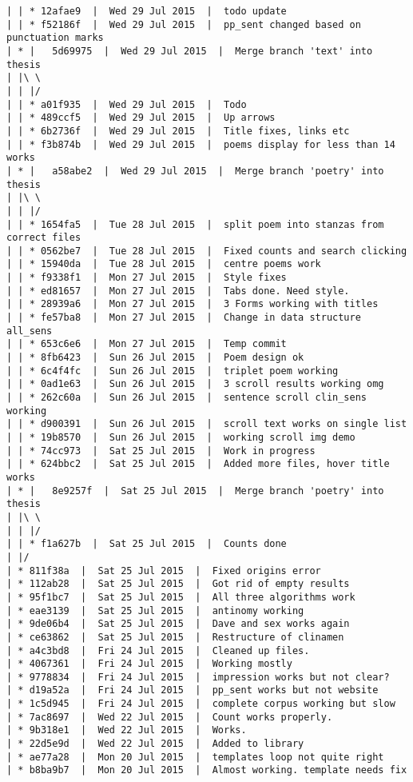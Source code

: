 \begin{verbatim}
| | * 12afae9  |  Wed 29 Jul 2015  |  todo update
| | * f52186f  |  Wed 29 Jul 2015  |  pp_sent changed based on punctuation marks
| * |   5d69975  |  Wed 29 Jul 2015  |  Merge branch 'text' into thesis
| |\ \  
| | |/  
| | * a01f935  |  Wed 29 Jul 2015  |  Todo
| | * 489ccf5  |  Wed 29 Jul 2015  |  Up arrows
| | * 6b2736f  |  Wed 29 Jul 2015  |  Title fixes, links etc
| | * f3b874b  |  Wed 29 Jul 2015  |  poems display for less than 14 works
| * |   a58abe2  |  Wed 29 Jul 2015  |  Merge branch 'poetry' into thesis
| |\ \  
| | |/  
| | * 1654fa5  |  Tue 28 Jul 2015  |  split poem into stanzas from correct files
| | * 0562be7  |  Tue 28 Jul 2015  |  Fixed counts and search clicking
| | * 15940da  |  Tue 28 Jul 2015  |  centre poems work
| | * f9338f1  |  Mon 27 Jul 2015  |  Style fixes
| | * ed81657  |  Mon 27 Jul 2015  |  Tabs done. Need style.
| | * 28939a6  |  Mon 27 Jul 2015  |  3 Forms working with titles
| | * fe57ba8  |  Mon 27 Jul 2015  |  Change in data structure all_sens
| | * 653c6e6  |  Mon 27 Jul 2015  |  Temp commit
| | * 8fb6423  |  Sun 26 Jul 2015  |  Poem design ok
| | * 6c4f4fc  |  Sun 26 Jul 2015  |  triplet poem working
| | * 0ad1e63  |  Sun 26 Jul 2015  |  3 scroll results working omg
| | * 262c60a  |  Sun 26 Jul 2015  |  sentence scroll clin_sens working
| | * d900391  |  Sun 26 Jul 2015  |  scroll text works on single list
| | * 19b8570  |  Sun 26 Jul 2015  |  working scroll img demo
| | * 74cc973  |  Sat 25 Jul 2015  |  Work in progress
| | * 624bbc2  |  Sat 25 Jul 2015  |  Added more files, hover title works
| * |   8e9257f  |  Sat 25 Jul 2015  |  Merge branch 'poetry' into thesis
| |\ \  
| | |/  
| | * f1a627b  |  Sat 25 Jul 2015  |  Counts done
| |/  
| * 811f38a  |  Sat 25 Jul 2015  |  Fixed origins error
| * 112ab28  |  Sat 25 Jul 2015  |  Got rid of empty results
| * 95f1bc7  |  Sat 25 Jul 2015  |  All three algorithms work
| * eae3139  |  Sat 25 Jul 2015  |  antinomy working
| * 9de06b4  |  Sat 25 Jul 2015  |  Dave and sex works again
| * ce63862  |  Sat 25 Jul 2015  |  Restructure of clinamen
| * a4c3bd8  |  Fri 24 Jul 2015  |  Cleaned up files.
| * 4067361  |  Fri 24 Jul 2015  |  Working mostly
| * 9778834  |  Fri 24 Jul 2015  |  impression works but not clear?
| * d19a52a  |  Fri 24 Jul 2015  |  pp_sent works but not website
| * 1c5d945  |  Fri 24 Jul 2015  |  complete corpus working but slow
| * 7ac8697  |  Wed 22 Jul 2015  |  Count works properly.
| * 9b318e1  |  Wed 22 Jul 2015  |  Works.
| * 22d5e9d  |  Wed 22 Jul 2015  |  Added to library
| * ae77a28  |  Mon 20 Jul 2015  |  templates loop not quite right
| * b8ba9b7  |  Mon 20 Jul 2015  |  Almost working. template needs fix

\end{verbatim}
